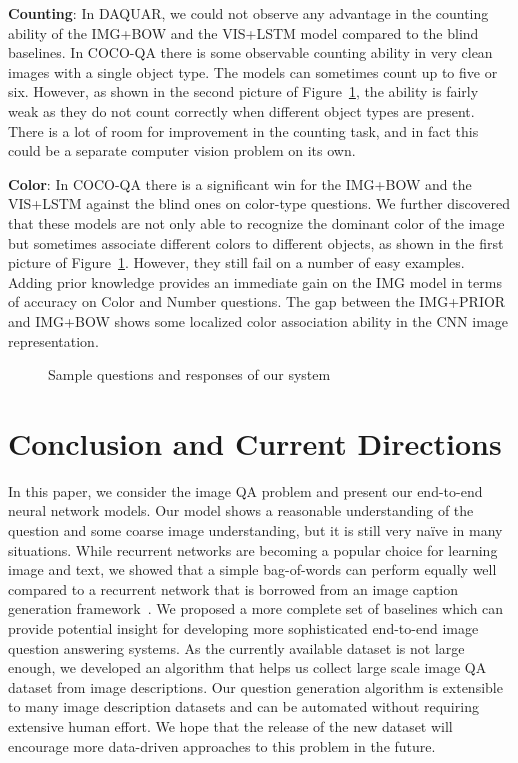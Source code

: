 \documentclass{article} \usepackage{nips15submit_e,times}
\renewcommand{\#}[1]{\textbf{#1}}
\begin{document}
\textbf{Counting}: In DAQUAR, we could not observe any advantage in the
counting ability of the IMG+BOW and the VIS+LSTM model compared to the blind
baselines. In COCO-QA there is some observable counting ability in very clean
images with a single object type. The models can sometimes count up to five or
six. However, as shown in the second picture of
Figure~\ref{fig:selected_questions}, the ability is fairly weak as they do not
count correctly when different object types are present. There is a lot of room
for improvement in the counting task, and in fact this could be a separate
computer vision problem on its own.

\textbf{Color}: In COCO-QA there is a significant win for the IMG+BOW and the
VIS+LSTM against the blind ones on color-type questions. We further discovered
that these models are not only able to recognize the dominant color of the image
but sometimes associate different colors to different objects, as shown in the
first picture of Figure~\ref{fig:selected_questions}. However, they still
fail on a number of easy examples. Adding prior knowledge provides an
immediate gain on the IMG model in terms of accuracy on Color and Number
questions. The gap between the IMG+PRIOR and IMG+BOW shows some localized color
association ability in the CNN image representation.

\begin{figure}
\centering\tiny

\caption{Sample questions and responses of our system}
\label{fig:selected_questions}
\end{figure}

\section{Conclusion and Current Directions}

In this paper, we consider the image QA problem and present our end-to-end
neural network models. Our model shows a reasonable understanding of the
question and some coarse image understanding, but it is still very na\"{i}ve in
many situations. While recurrent networks are becoming a popular choice for
learning image and text, we showed that a simple bag-of-words can perform equally
well compared to a recurrent network that is borrowed from an image caption
generation framework~\cite{vinyals14}. We proposed a more complete set of
baselines which can provide potential insight for developing more sophisticated
end-to-end image question answering systems. As the currently available dataset
is not large enough, we developed an algorithm that helps us collect large scale
image QA dataset from image descriptions. Our question generation algorithm is
extensible to many image description datasets and can be automated without
requiring extensive human effort. We hope that the release of the new dataset
will encourage more data-driven approaches to this problem in the future.
\end{document}
